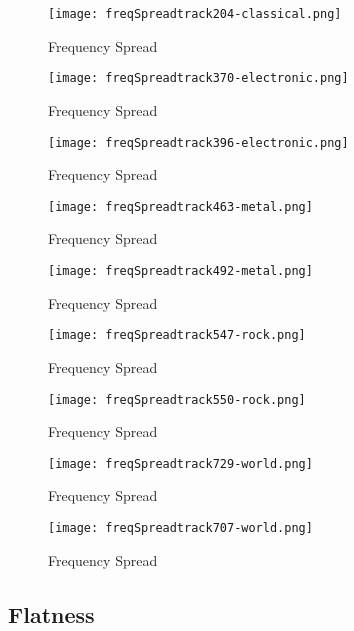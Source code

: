 \documentclass{article} %
\begin{document}
\begin{figure}[H]
\centering
\texttt{[image: freqSpreadtrack204-classical.png]}
\caption{Frequency Spread}
\label{fig:spread204}
\end{figure}

\begin{figure}[H]
\centering
\texttt{[image: freqSpreadtrack370-electronic.png]}
\caption{Frequency Spread}
\label{fig:spread370}
\end{figure}


\begin{figure}[H]
\centering
\texttt{[image: freqSpreadtrack396-electronic.png]}
\caption{Frequency Spread}
\label{fig:spread396}
\end{figure}


\begin{figure}[H]
\centering
\texttt{[image: freqSpreadtrack463-metal.png]}
\caption{Frequency Spread}
\label{fig:spread463}
\end{figure}


\begin{figure}[H]
\centering
\texttt{[image: freqSpreadtrack492-metal.png]}
\caption{Frequency Spread}
\label{fig:spread492}
\end{figure}


\begin{figure}[H]
\centering
\texttt{[image: freqSpreadtrack547-rock.png]}
\caption{Frequency Spread}
\label{fig:spread547}
\end{figure}


\begin{figure}[H]
\centering
\texttt{[image: freqSpreadtrack550-rock.png]}
\caption{Frequency Spread}
\label{fig:spread550}
\end{figure}


\begin{figure}[H]
\centering
\texttt{[image: freqSpreadtrack729-world.png]}
\caption{Frequency Spread}
\label{fig:spread729}
\end{figure}


\begin{figure}[H]
\centering
\texttt{[image: freqSpreadtrack707-world.png]}
\caption{Frequency Spread}
\label{fig:spread707}
\end{figure}


\subsection{Flatness}
\end{document}
